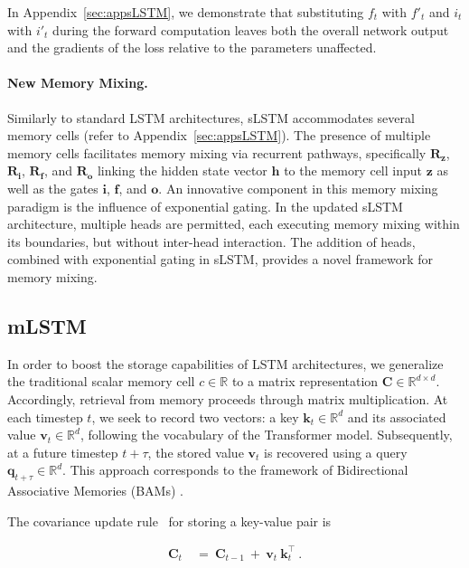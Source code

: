 In Appendix~\ref{sec:appsLSTM}, we demonstrate that substituting $f_t$ with $f'_t$ and $i_t$ with $i'_t$ during the forward computation leaves both the overall network output and the gradients of the loss relative to the parameters unaffected.

\paragraph{New Memory Mixing.} Similarly to standard LSTM architectures, sLSTM accommodates several memory cells (refer to Appendix~\ref{sec:appsLSTM}). The presence of multiple memory cells facilitates memory mixing via recurrent pathways, specifically $\mathbf{R}_{\mathbf{z}}$, $\mathbf{R}_{\mathbf{i}}$, $\mathbf{R}_{\mathbf{f}}$, and $\mathbf{R}_{\mathbf{o}}$ linking the hidden state vector $\mathbf{h}$ to the memory cell input $\mathbf{z}$ as well as the gates $\mathbf{i}$, $\mathbf{f}$, and $\mathbf{o}$. An innovative component in this memory mixing paradigm is the influence of exponential gating. In the updated sLSTM architecture, multiple heads are permitted, each executing memory mixing within its boundaries, but without inter-head interaction. The addition of heads, combined with exponential gating in sLSTM, provides a novel framework for memory mixing.

\subsection{mLSTM}
\label{sec:mLSTM}

In order to boost the storage capabilities of LSTM architectures, we generalize the traditional scalar memory cell $c \in \mathbb{R}$ to a matrix representation $\mathbf{C} \in \mathbb{R}^{d \times d}$. Accordingly, retrieval from memory proceeds through matrix multiplication. At each timestep $t$, we seek to record two vectors: a key $\mathbf{k}_t \in \mathbb{R}^d$ and its associated value $\mathbf{v}_t \in \mathbb{R}^d$, following the vocabulary of the Transformer model. Subsequently, at a future timestep $t + \tau$, the stored value $\mathbf{v}_t$ is recovered using a query $\mathbf{q}_{t+\tau} \in \mathbb{R}^d$. This approach corresponds to the framework of Bidirectional Associative Memories (BAMs) \citep{Kohonen:72,Anderson:72,Nakano:72,Anderson:77}.

The covariance update rule~\citep{Sejnowski:77,Dayan:91} for storing a key-value pair is

\begin{align}
\mathbf{C}_t \ &= \ \mathbf{C}_{t-1} \ + \ \mathbf{v}_{t} \ \mathbf{k}_t^\top \ .
\end{align}

